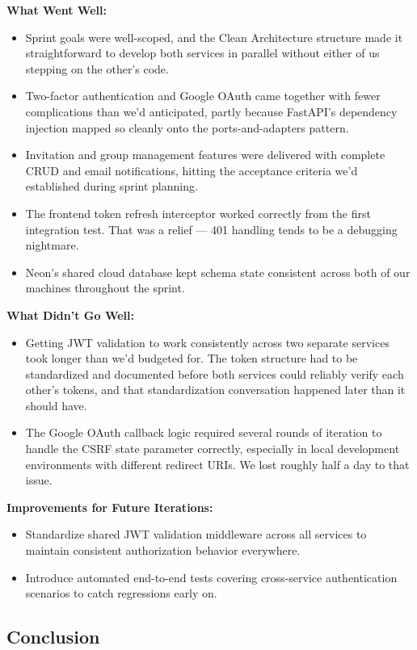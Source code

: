 \documentclass[12pt,a4paper,oneside]{report}
\begin{document}
\textbf{What Went Well:}
\begin{itemize}
  \item Sprint goals were well-scoped, and the Clean Architecture structure made it straightforward to develop both services in parallel without either of us stepping on the other's code.
  \item Two-factor authentication and Google OAuth came together with fewer complications than we'd anticipated, partly because FastAPI's dependency injection mapped so cleanly onto the ports-and-adapters pattern.
  \item Invitation and group management features were delivered with complete CRUD and email notifications, hitting the acceptance criteria we'd established during sprint planning.
  \item The frontend token refresh interceptor worked correctly from the first integration test. That was a relief — 401 handling tends to be a debugging nightmare.
  \item Neon's shared cloud database kept schema state consistent across both of our machines throughout the sprint.
\end{itemize}

\textbf{What Didn't Go Well:}
\begin{itemize}
  \item Getting JWT validation to work consistently across two separate services took longer than we'd budgeted for. The token structure had to be standardized and documented before both services could reliably verify each other's tokens, and that standardization conversation happened later than it should have.
  \item The Google OAuth callback logic required several rounds of iteration to handle the CSRF state parameter correctly, especially in local development environments with different redirect URIs. We lost roughly half a day to that issue.
\end{itemize}

\textbf{Improvements for Future Iterations:}
\begin{itemize}
  \item Standardize shared JWT validation middleware across all services to maintain consistent authorization behavior everywhere.
  \item Introduce automated end-to-end tests covering cross-service authentication scenarios to catch regressions early on.
\end{itemize}

\subsection*{Conclusion}
\end{document}
